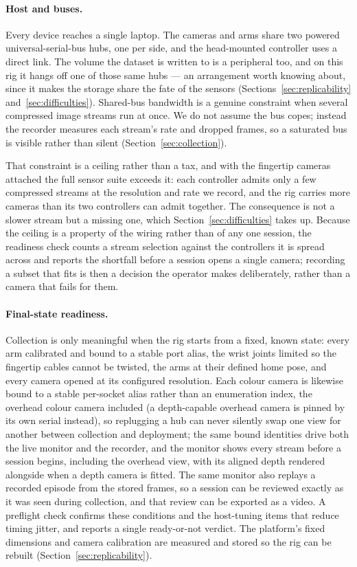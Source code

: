 \paragraph{Host and buses.} Every device reaches a single laptop. The
cameras and arms share two powered universal-serial-bus hubs, one per side,
and the head-mounted controller uses a direct link. The volume the dataset is
written to is a peripheral too, and on this rig it hangs off one of those same
hubs --- an arrangement worth knowing about, since it makes the storage share the
fate of the sensors (Sections~\ref{sec:replicability} and~\ref{sec:difficulties}).
Shared-bus bandwidth is
a genuine constraint when several compressed image streams run at once. We
do not assume the bus copes; instead the recorder measures each stream's
rate and dropped frames, so a saturated bus is visible rather than silent
(Section~\ref{sec:collection}).

That constraint is a ceiling rather than a tax, and with the fingertip cameras
attached the full sensor suite exceeds it: each controller admits only a few
compressed streams at the resolution and rate we record, and the rig carries
more cameras than its two controllers can admit together. The consequence is
not a slower stream but a missing one, which Section~\ref{sec:difficulties}
takes up. Because the ceiling is a property of the wiring rather than of any
one session, the readiness check counts a stream selection against the
controllers it is spread across and reports the shortfall before a session
opens a single camera; recording a subset that fits is then a decision the
operator makes deliberately, rather than a camera that fails for them.

\paragraph{Final-state readiness.} Collection is only meaningful when the
rig starts from a fixed, known state: every arm calibrated and bound to a
stable port alias, the wrist joints limited so the fingertip cables cannot
be twisted, the arms at their defined home pose, and every camera opened at
its configured resolution. Each colour camera is likewise bound to a stable
per-socket alias rather than an enumeration index, the overhead colour
camera included (a depth-capable overhead camera is pinned by its own serial
instead), so replugging a hub can never silently swap one view for another
between collection and deployment; the same bound identities drive both the
live monitor and the recorder, and the monitor shows every stream before a
session begins, including the overhead view, with its aligned depth rendered
alongside when a depth camera is fitted. The same monitor also
replays a recorded episode from the stored frames, so a session can be
reviewed exactly as it was seen during collection, and that review can be
exported as a video. A
preflight check confirms these conditions and
the host-tuning items that reduce timing jitter, and reports a single
ready-or-not verdict. The platform's fixed dimensions and camera
calibration are measured and stored so the rig can be rebuilt
(Section~\ref{sec:replicability}).
